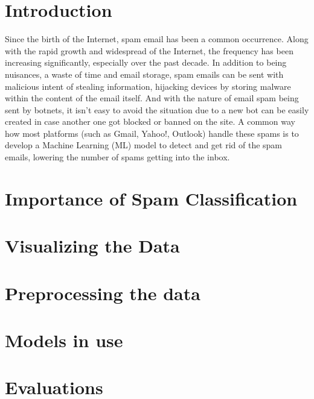 \documentclass[conference]{IEEEtran}
\begin{document}
    \section{Introduction}
    \label{sec:introduction}
    Since the birth of the Internet, spam email has been a common occurrence.
    Along with the rapid growth and widespread of the Internet, the frequency has been increasing significantly, especially over the past decade.
    In addition to being nuisances, a waste of time and email storage, spam emails can be sent with malicious intent of stealing information, hijacking devices by storing malware within the content of the email itself.
    And with the nature of email spam being sent by botnets, it isn't easy to avoid the situation due to a new bot can be easily created in case another one got blocked or banned on the site.
    A common way how most platforms (such as Gmail, Yahoo!, Outlook) handle these spams is to develop a Machine Learning (ML) model to detect and get rid of the spam emails, lowering the number of spams getting into the inbox.

    \section{Importance of Spam Classification}
    \label{sec:importance-of-spam-classification}
    

    \section{Visualizing the Data}
    \label{sec:visualizing-the-data}
    

    \section{Preprocessing the data}
    \label{sec:preprocessing-the-data}
    

    \section{Models in use}
    \label{sec:models-in-use}
    

    \section{Evaluations}
    \label{sec:evaluations}
    
\end{document}
